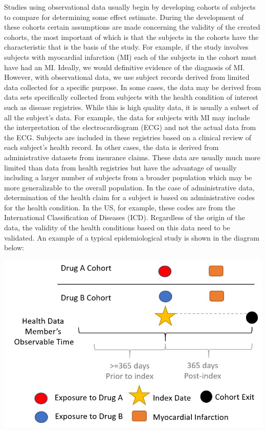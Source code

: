 \documentclass[11pt]{book}
\theoremstyle{definition}
\theoremstyle{definition}
\theoremstyle{definition}
\theoremstyle{remark}
\begin{document}
Studies using observational data usually begin by developing cohorts of subjects to compare for determining some effect estimate. During the development of these cohorts certain assumptions are made concerning the validity of the created cohorts, the most important of which is that the subjects in the cohorts have the characteristic that is the basis of the study. For example, if the study involves subjects with myocardial infarction (MI) each of the subjects in the cohort must have had an MI. Ideally, we would definitive evidence of the diagnosis of MI. However, with observational data, we use subject records derived from limited data collected for a specific purpose. In some cases, the data may be derived from data sets specifically collected from subjects with the health condition of interest such as disease registries. While this is high quality data, it is usually a subset of all the subject's data. For example, the data for subjects with MI may include the interpretation of the electrocardiogram (ECG) and not the actual data from the ECG. Subjects are included in these registries based on a clinical review of each subject's health record. In other cases, the data is derived from administrative datasets from insurance claims. These data are usually much more limited than data from health registries but have the advantage of usually including a larger number of subjects from a broader population which may be more generalizable to the overall population. In the case of administrative data, determination of the health claim for a subject is based on administrative codes for the health condition. In the US, for example, these codes are from the International Classification of Diseases (ICD). Regardless of the origin of the data, the validity of the health conditions based on this data need to be validated.
An example of a typical epidemiological study is shown in the diagram below:  

\begin{center}\includegraphics[width=0.75\linewidth]{images/ClinicalValidity/figure1} \end{center}
\end{document}
